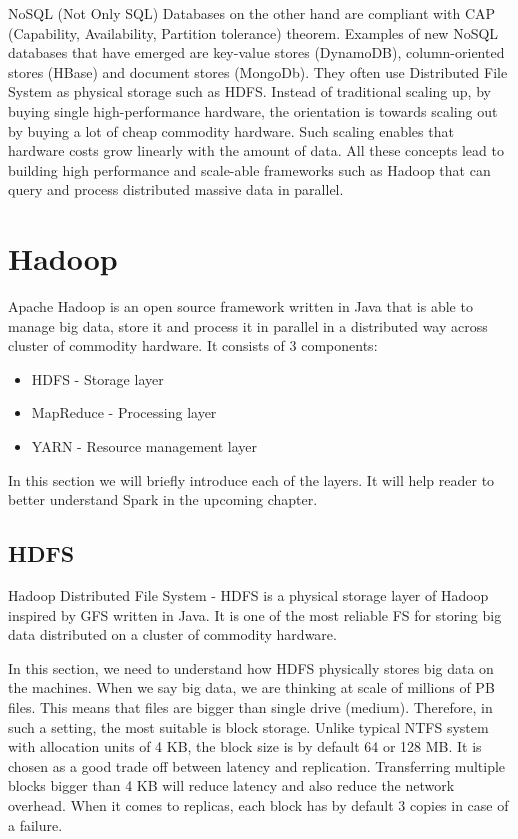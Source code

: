 NoSQL (Not Only SQL) Databases on the other hand are compliant with CAP (Capability, Availability, Partition tolerance) theorem.  Examples of new NoSQL databases that have emerged are key-value stores (DynamoDB), column-oriented stores (HBase) and document stores (MongoDb). They often use Distributed File System as physical storage such as HDFS. Instead of traditional scaling up, by buying single high-performance hardware, the orientation is towards scaling out by buying a lot of cheap commodity hardware. Such scaling enables that hardware costs grow linearly with the amount of data. All these concepts lead to building high performance and scale-able frameworks such as Hadoop that can query and process distributed massive data in parallel. 

\section{Hadoop}
Apache Hadoop \cite{Hadoop} is an open source framework written in Java that is able to manage big data, store it and process it in parallel in a distributed way across cluster of commodity hardware. It consists of 3 components:
\begin{itemize}
	\item HDFS - Storage layer
	\item MapReduce - Processing layer
	\item YARN - Resource management layer
\end{itemize}

In this section we will briefly introduce each of the layers. It will help reader to better understand Spark in the upcoming chapter.

\subsection{HDFS}
Hadoop Distributed File System - HDFS \cite{HDFS} is a physical storage layer of Hadoop inspired by GFS \cite{GFS} written in Java. It is one of the most reliable FS for storing big data distributed on a cluster of commodity hardware. 

In this section, we need to understand how HDFS physically stores big data on the machines. When we say big data, we are thinking at scale of millions of PB files. This means that files are bigger than single drive (medium). Therefore, in such a setting, the most suitable is block storage. Unlike typical NTFS system with allocation units of 4 KB, the block size is by default 64 or 128 MB. It is chosen as a good trade off between latency and replication. Transferring multiple blocks bigger than 4 KB will reduce latency and also reduce the network overhead. When it comes to replicas, each block has by default 3 copies in case of a failure.  

